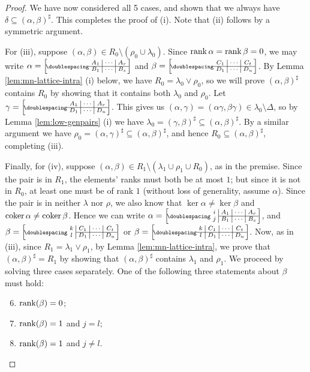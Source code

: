 \begin{lemma}
\begin{proof}
    We have now considered all 5 cases, and shown that we always have
    $\delta \subseteq (\alpha, \beta)^\sharp$.  This completes the proof of
    (i).  Note that (ii) follows by a symmetric argument.

    For (iii), suppose $(\alpha,\beta)\in R_0\setminus(\rho_0\cup\lambda_0)$.
    Since $\operatorname{rank}\alpha = \operatorname{rank}\beta = 0$, we may write
    $\alpha=\bipart{c|c|c}{1-3}{A_1 & \cdots & A_r}{B_1 & \cdots & B_s}$ and
    $\beta=\bipart{c|c|c}{1-3}{C_1 & \cdots & C_t}{D_1 & \cdots & D_u}$.
    By Lemma \ref{lem:mn-lattice-intra} (i) below, we have
    $R_0 = \lambda_0\vee\rho_0$, so we will prove $(\alpha,\beta)^\sharp$
    contains $R_0$ by showing that it contains both $\lambda_0$ and $\rho_0$.
    Let $\gamma = \bipart{c|c|c}{1-3}{A_1 & \cdots & A_r}{D_1 & \cdots & D_u}$.
    This gives us
    $(\alpha,\gamma) = (\alpha\gamma,\beta\gamma) \in \lambda_0\setminus\Delta$,
    so by Lemma \ref{lem:low-genpairs} (i) we have
    $\lambda_0 = (\gamma,\beta)^\sharp \subseteq (\alpha, \beta)^\sharp$.  By a
    similar argument we have
    $\rho_0 = (\alpha,\gamma)^\sharp \subseteq (\alpha,\beta)^\sharp$, and hence
    $R_0 \subseteq (\alpha,\beta)^\sharp$, completing (iii).

    Finally, for (iv), suppose
    $(\alpha,\beta) \in R_1 \setminus (\lambda_1 \cup \rho_1 \cup R_0)$, as in
    the premise.  Since the pair is in $R_1$, the elements' ranks must both be
    at most $1$; but since it is not in $R_0$, at least one must be of rank $1$
    (without loss of generality, assume $\alpha$).  Since the pair is in neither
    $\lambda$ nor $\rho$, we also know that $\ker\alpha \neq \ker\beta$ and
    $\operatorname{coker}\alpha \neq \operatorname{coker}\beta$.
    Hence we can write
    $\alpha = \bipart{c|c|c|c}{2-4}
    {i & A_1 & \cdots & A_r}{j & B_1 & \cdots & B_s}$, and
    $\beta = \bipart{c|c|c|c}{2-4}
    {k & C_1 & \cdots & C_t}{l & D_1 & \cdots & D_u}$ or
    $\beta = \bipart{c|c|c|c}{1-4}
    {k & C_1 & \cdots & C_t}{l & D_1 & \cdots & D_u}$.  Now, as in (iii),
    since $R_1 = \lambda_1 \vee \rho_1$, by Lemma \ref{lem:mn-lattice-intra}, we
    prove that $(\alpha,\beta)^\sharp = R_1$ by showing that
    $(\alpha,\beta)^\sharp$ contains $\lambda_1$ and $\rho_1$.  We proceed by
    solving three cases separately.  One of the following three statements about
    $\beta$ must hold:
    \begin{enumerate}[\rm(a)]
      \setcounter{enumi}{5}
    \item $\operatorname{rank}(\beta) = 0$;
    \item $\operatorname{rank}(\beta) = 1$ and $j = l$;
    \item $\operatorname{rank}(\beta) = 1$ and $j \neq l$.
    \end{enumerate}


\end{proof}
\end{lemma}
